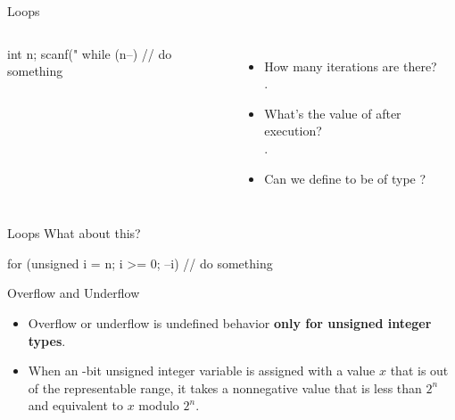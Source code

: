 \documentclass{beamer}
\begin{document}
\begin{frame}[fragile]{Loops}
    \begin{columns}
        \begin{cpp}
int n;
scanf("%
while (n--) {
  // do something
}
        \end{cpp}
        \begin{itemize}
            \item How many iterations are there?\\
            \pause
            .
            \pause
            \item What's the value of  after execution?\\
            \pause
            .
            \pause
            \item Can we define  to be of type ?
        \end{itemize}
    \end{columns}
\end{frame}

\begin{frame}[fragile]{Loops}
    What about this?
    \begin{cpp}
for (unsigned i = n; i >= 0; --i) {
  // do something
}
    \end{cpp}
    \pause
\end{frame}

\begin{frame}{Overflow and Underflow}
    \begin{itemize}
        \item Overflow or underflow is  undefined behavior \textbf{only for unsigned integer types}.
        \item When an -bit unsigned integer variable is assigned with a value \(x\) that is out of the representable range, it takes a nonnegative value that is less than \(2^n\) and equivalent to \(x\) modulo \(2^n\).
    \end{itemize}
\end{frame}
\end{document}
